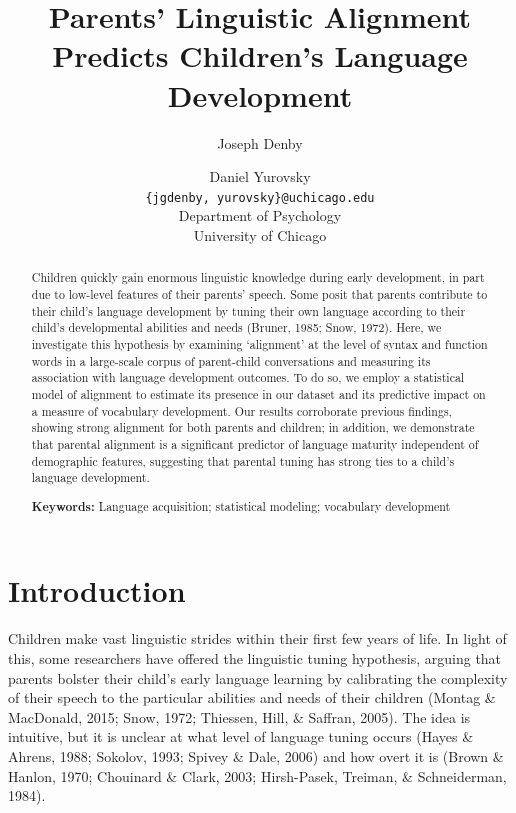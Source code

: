 \documentclass[10pt, letterpaper]{article}
\title{Parents' Linguistic Alignment Predicts Children's Language Development}
\author{Joseph Denby \and Daniel Yurovsky \\
        \texttt{\{jgdenby, yurovsky\}@uchicago.edu} \\
       Department of Psychology \\ University of Chicago}
\begin{document}
\maketitle

\begin{abstract}
Children quickly gain enormous linguistic knowledge during early
development, in part due to low-level features of their parents' speech.
Some posit that parents contribute to their child's language development
by tuning their own language according to their child's developmental
abilities and needs (Bruner, 1985; Snow, 1972). Here, we investigate
this hypothesis by examining `alignment' at the level of syntax and
function words in a large-scale corpus of parent-child conversations and
measuring its association with language development outcomes. To do so,
we employ a statistical model of alignment to estimate its presence in
our dataset and its predictive impact on a measure of vocabulary
development. Our results corroborate previous findings, showing strong
alignment for both parents and children; in addition, we demonstrate
that parental alignment is a significant predictor of language maturity
independent of demographic features, suggesting that parental tuning has
strong ties to a child's language development.

\textbf{Keywords:}
Language acquisition; statistical modeling; vocabulary development
\end{abstract}

\hypertarget{introduction}{%
\section{Introduction}\label{introduction}}

Children make vast linguistic strides within their first few years of
life. In light of this, some researchers have offered the linguistic
tuning hypothesis, arguing that parents bolster their child's early
language learning by calibrating the complexity of their speech to the
particular abilities and needs of their children (Montag \& MacDonald,
2015; Snow, 1972; Thiessen, Hill, \& Saffran, 2005). The idea is
intuitive, but it is unclear at what level of language tuning occurs
(Hayes \& Ahrens, 1988; Sokolov, 1993; Spivey \& Dale, 2006) and how
overt it is (Brown \& Hanlon, 1970; Chouinard \& Clark, 2003;
Hirsh-Pasek, Treiman, \& Schneiderman, 1984).
\end{document}
